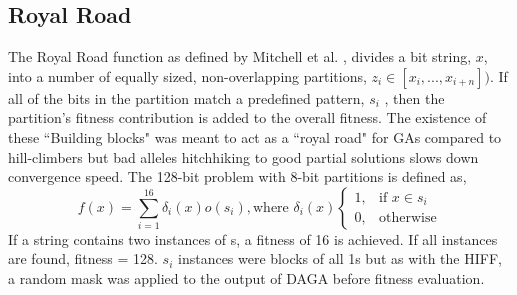 \documentclass[runningheads,a4paper]{llncs}
\begin{document}
\subsection{Royal Road}
The Royal Road function as defined by Mitchell et al. \cite{mitchell}, divides a bit string, \(x\), into a number of  equally sized, non-overlapping partitions, \(z_i\in[x_i, ..., x_{i+n}])\). If all of the bits in the partition match a predefined pattern, \(s_i\) , then the partition's fitness contribution is added to the overall fitness. The existence of these ``Building blocks" was meant to act as a ``royal road" for GAs compared to hill-climbers but bad alleles hitchhiking to good partial solutions slows down convergence speed. The 128-bit problem with 8-bit partitions is defined as,
\\
\[
    f(x)= \sum_{i=1}^{16} \delta_i(x)o(s_i), \text{where } \delta_i(x)
\begin{cases}
    1,& \text{if } x\in s_i\\
    0,              & \text{otherwise}
\end{cases}
\] 
If a string contains two instances of s, a fitness of 16 is achieved. If all instances are found, fitness = 128. \(s_i\) instances were blocks of all 1s but as with the HIFF, a random mask was applied to the output of DAGA before fitness evaluation.
\end{document}
